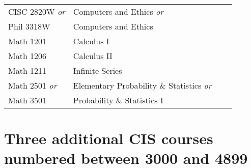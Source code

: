 \documentclass{article}
\begin{document}
\begin{Form}
\begin{tabular}{ |p{3.27cm}|p{6cm}|p{4.8cm}|p{2.3cm}|  }
		CISC 2820W \emph{or} & Computers and Ethics \emph{or}                 & \TextField[name=2820W_instructor,width=4.8cm,charsize=8pt,bordercolor=1 1 1,borderstyle=U]{}  & \TextField[name=2820W_grade,width=2.2cm,charsize=8pt,bordercolor=1 1 1]{{}}  \\
		Phil 3318W           & Computers and Ethics                           & \TextField[name=P3318W_instructor,width=4.8cm,charsize=8pt,bordercolor=1 1 1,borderstyle=U]{} & \TextField[name=P3318W_grade,width=2.2cm,charsize=8pt,bordercolor=1 1 1]{{}} \\
		\hline
		Math 1201            & Calculus I                                     & \TextField[name=M1201_instructor,width=4.8cm,charsize=8pt,bordercolor=1 1 1,borderstyle=U]{}  & \TextField[name=M1201_grade,width=2.2cm,charsize=8pt,bordercolor=1 1 1]{{}}  \\
		\hline
		Math 1206            & Calculus II                                    & \TextField[name=M1206_instructor,width=4.8cm,charsize=8pt,bordercolor=1 1 1,borderstyle=U]{}  & \TextField[name=M1206_grade,width=2.2cm,charsize=8pt,bordercolor=1 1 1]{{}}  \\
		\hline
		Math 1211            & Infinite Series                                & \TextField[name=M1211_instructor,width=4.8cm,charsize=8pt,bordercolor=1 1 1,borderstyle=U]{}  & \TextField[name=M1211_grade,width=2.2cm,charsize=8pt,bordercolor=1 1 1]{{}}  \\
		\hline
		Math 2501 \emph{or}  & Elementary Probability \& Statistics \emph{or} & \TextField[name=M2501_instructor,width=4.8cm,charsize=8pt,bordercolor=1 1 1,borderstyle=U]{}  & \TextField[name=M2501_grade,width=2.2cm,charsize=8pt,bordercolor=1 1 1]{{}}  \\
		Math 3501            & Probability \& Statistics I                    & \TextField[name=M3501_instructor,width=4.8cm,charsize=8pt,bordercolor=1 1 1,borderstyle=U]{}  & \TextField[name=M3501_grade,width=2.2cm,charsize=8pt,bordercolor=1 1 1]{{}}  \\
		\hline
	\end{tabular}

	\section*{Three additional CIS courses numbered between 3000 and 4899}
	\setlength\tabcolsep{4pt}

	\begin{tabular}{ |p{3.27cm}|p{6cm}|p{4.8cm}|p{2.3cm}|  }


\end{tabular}
\end{Form}
\end{document}
